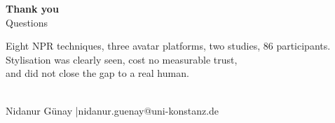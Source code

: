 \documentclass[aspectratio=169,10pt]{beamer}
\begin{document}
\begin{frame}[plain]
  \vspace{2.2em}
  \begin{center}
    {\LARGE\bfseries\color{knblue} Thank you}\\[1.2em]
    {\large\color{kngrey} Questions}\\[2.0em]
    \colorbox{knlight}{\parbox{0.78\textwidth}{\centering\color{knblue}\small
    Eight NPR techniques, three avatar platforms, two studies, 86 participants.\\[0.6em]
    Stylisation was clearly seen, cost no measurable trust,\\ and did not close the gap to a real human.}}\\[1.6em]
    {\footnotesize\color{kngrey} Nidanur Günay \quad|\quad nidanur.guenay@uni-konstanz.de}
  \end{center}
\end{frame}
\end{document}
